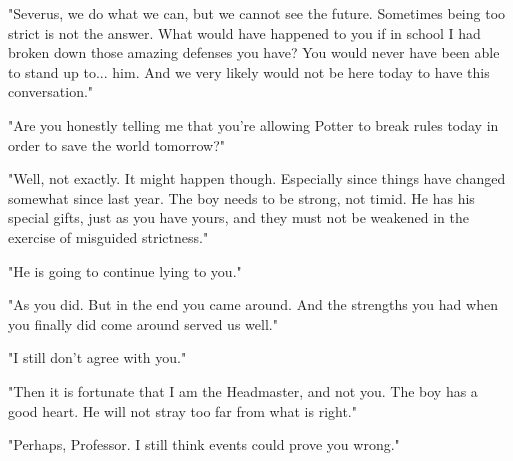 \documentclass[a4paper,11pt]{article}
\begin{document}
"Severus, we do what we can, but we cannot see the future. Sometimes being too strict is not the answer. What would have happened to you if in school I had broken down those amazing defenses you have? You would never have been able to stand up to... him. And we very likely would not be here today to have this conversation."

"Are you honestly telling me that you're allowing Potter to break rules today in order to save the world tomorrow?"

"Well, not exactly. It might happen though. Especially since things have changed somewhat since last year. The boy needs to be strong, not timid. He has his special gifts, just as you have yours, and they must not be weakened in the exercise of misguided strictness."

"He is going to continue lying to you."

"As you did. But in the end you came around. And the strengths you had when you finally did come around served us well."

"I still don't agree with you."

"Then it is fortunate that I am the Headmaster, and not you. The boy has a good heart. He will not stray too far from what is right."

"Perhaps, Professor. I still think events could prove you wrong."
\end{document}
